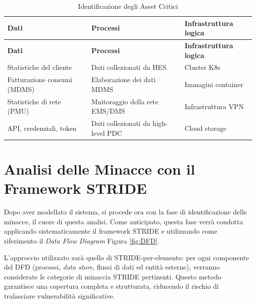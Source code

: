 \renewcommand{\arraystretch}{1.5}
\begin{longtable}[!h]{p{5cm}p{5cm}p{5cm}}
        
    \caption{Identificazione degli Asset Critici}
    \label{tab:def-asset}\\
    
    \hline
    \textbf{Dati} &  \textbf{Processi} & \textbf{Infrastruttura logica}\\
    \hline
    \endfirsthead
    
    \hline
    \textbf{Dati} &  \textbf{Processi} & \textbf{Infrastruttura logica}\\
    \hline
    \endhead
    
    
    Statistiche del cliente   &    Dati collezionati da HES & Cluster K8s  \\         
    Fatturazione consumi (MDMS) &   Elaborazione dei dati MDMS & Immagini container \\
    Statistiche di rete (PMU) &  Mnitoraggio della rete EMS/DMS & Infrastruttura VPN \\    
    API, credenziali, token & Dati collezionati da high-level PDC & Cloud storage  \\
    
    
    \hline
\end{longtable}

\newpage
\section{Analisi delle Minacce con il Framework STRIDE}

Dopo aver modellato il sistema, si procede ora con la fase di identificazione delle minacce, il cuore di questa analisi. Come anticipato, questa fase verrà condotta applicando sistematicamente il framework STRIDE e utilizzando come riferimento il \textit{Data Flow Diagram} Figura \ref{fig:DFD}.


L'approccio utilizzato sarà quello di STRIDE-per-elemento: per ogni componente del DFD (processi, \textit{data store}, flussi di dati ed entità esterne), verranno considerate le categorie di minaccia STRIDE pertinenti. Questo metodo garantisce una copertura completa e strutturata, riducendo il rischio di tralasciare vulnerabilità significative.




    
